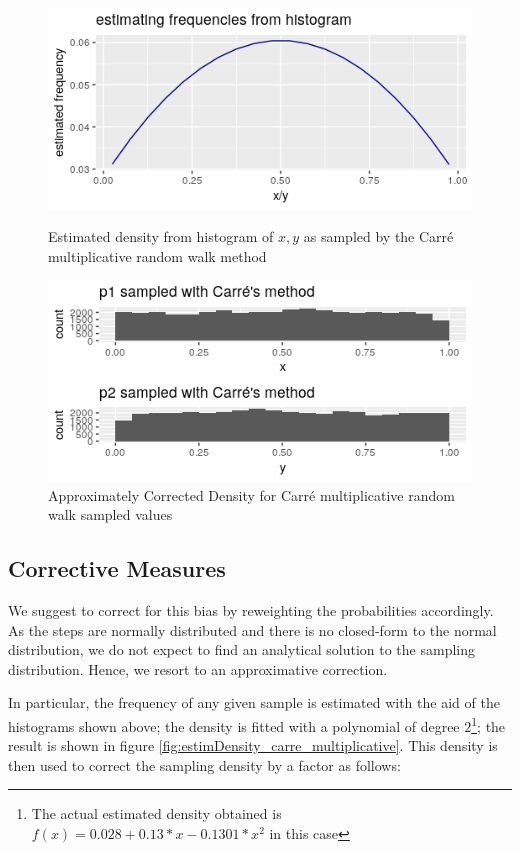  \begin{minipage}{\linewidth}
	\centering
	\begin{minipage}{0.45\linewidth}
		\begin{figure}[H]
		\includegraphics[width=\linewidth]{img/carreCorrectionEstimatedFrequencies.png}
		\caption{Estimated density from histogram of $x, y$ as sampled by the Carré multiplicative random walk method}
		\label{fig:estimDensity_carre_multiplicative}

		\includegraphics[width=1.0\linewidth]{img/carreCorrectedDensity.png}
		\caption{Approximately Corrected Density for Carré multiplicative random walk sampled values}
		\label{fig:carreCorrectedWorks}
		\end{figure}
	\end{minipage}
	\hspace{0.05\linewidth}
	\begin{minipage}{0.45\linewidth}
		\subsection{Corrective Measures}
		We suggest to correct for this bias by reweighting the probabilities accordingly. As the steps are normally distributed and there is no closed-form to the normal distribution, we do not expect to find an analytical solution to the sampling distribution. 
		Hence, we resort to an approximative correction. 
		
		In particular, the frequency of any given sample is estimated with the aid of the histograms shown above; the density is fitted with a polynomial of degree $2$\footnote{The actual estimated density obtained is $f(x) = 0.028 + 0.13 * x - 0.1301 * x^2$ in this case}; the result is shown in figure \ref{fig:estimDensity_carre_multiplicative}. This density is then used to correct the sampling density by a factor as follows:
	\end{minipage}
\end{minipage}

